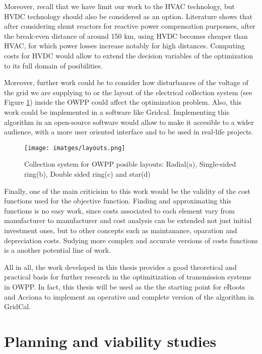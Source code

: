 \documentclass[a4paper,11pt, titlepage, twoside]{article}
\begin{document}
Moreover, recall that we have limit our work to the HVAC technology, but HVDC technology should also be considered as an option.
Literature \cite{paperbase} shows that after considering shunt reactors for reactive power compensation purpouses, after the break-even distance of around 150 km,
using HVDC becomes cheaper than HVAC, for which power losses increase notably for high distances. Computing costs for HVDC would allow to extend the decision variables of the optimization to its full
domain of posibilities.\par

Moreover, further work could be to consider how disturbances of the voltage of the grid we are supplying to or the layout of the electrical collection system (see Figure \ref{layouts_shape}) inside the OWPP could affect the optimization problem. 
Also, this work could be implemented in a software like Gridcal. Implementing this algorithm in an open-source software would allow to make it accesible to a wider audience, with a more user oriented interface and to be used in real-life projects.

\begin{figure}[H]
    \centering
    \texttt{[image: imatges/layouts.png]}
    \caption{Collection system for OWPP posible layouts: Radial(a), Single-sided ring(b), Double sided ring(c) and star(d) \cite{layouts_coll}}
    \label{layouts_shape}
\end{figure}

Finally, one of the main criticisim to this work would be the validity of the cost functions used for the objective function. Finding and approximating this functions is no easy work,
since costs associated to each element vary from manufacturer to manufacturer and cost analysis can be extended not just initial investment ones, but to other concepts such as maintanance, oparation and depreciation costs. Sudying more complex and accurate 
versions of costs functions is a another potential line of work.\par

All in all, the work developed in this thesis provides a good theoretical and practical basis for further research in the optimitization of transmission systems in OWPP. In fact, this thesis will be used as the the starting point for eRoots  and Acciona to implement an operative and complete version of the algorithm in GridCal.
\section{Planning and viability studies}\label{Planning}
\end{document}
